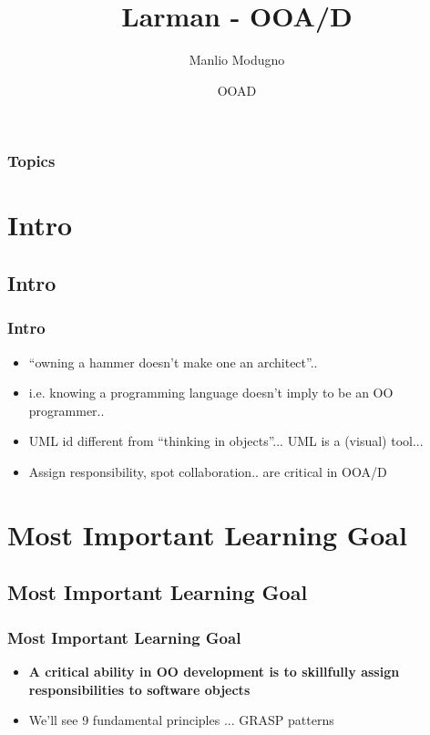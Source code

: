 \documentclass{beamer}
\title{Larman - OOA/D}
\author{Manlio Modugno}
\institute[GMTechnologies]
\date[]{OOAD}
\begin{document}
\begin{frame}
  \titlepage
\end{frame}

\begin{frame}
  \frametitle{Topics}
  \tableofcontents
\end{frame}


\section{Intro}
\subsection{Intro}
\begin{frame}
  \frametitle{Intro}
  \begin{itemize}
	\item<+-> ``owning a hammer doesn't make one an architect''..
	\item<+-> i.e. knowing a programming language doesn't imply to be an OO programmer..
	\item<+-> UML id different from ``thinking in objects''... UML is a (visual) tool...
	\item<+-> Assign responsibility, spot collaboration.. are critical in OOA/D
   \end{itemize}
\end{frame}

\section{Most Important Learning Goal}
\subsection{Most Important Learning Goal}
\begin{frame}
  \frametitle{Most Important Learning Goal}
  \begin{itemize}
	\item<+-> \textbf{A critical ability in OO development is to skillfully assign responsibilities to software objects}
	\item<+-> We'll see 9 fundamental principles ... GRASP patterns
   \end{itemize}
\end{frame}

\end{document}
